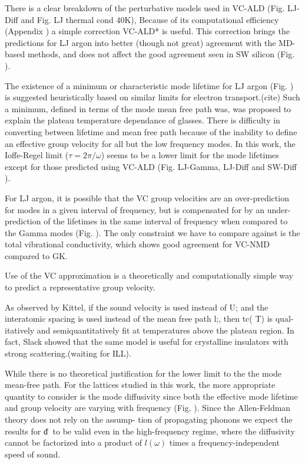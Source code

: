 \documentclass[aps,prb,onecolumn,preprint,superscriptaddress,amsmath,amssymb,floatfix]{revtex4}
\begin{document}
There is a clear breakdown of the perturbative models used in  
VC-ALD (Fig. LJ-Diff and Fig. LJ thermal cond 40K), 
Because of its computational efficiency (Appendix ) a simple correction 
VC-ALD* is useful. This correction brings the predictions for LJ argon 
into better (though not great) agreement with the MD-based methods, and 
does not affect the good agreement seen in SW silicon (Fig. ). 

The existence of a minimum or characteristic mode lifetime for 
LJ argon (Fig. ) is suggested heuristically based on similar limits 
for electron transport.(cite) Such a minimum, defined in terms of the mode 
mean free path was, was proposed to explain the plateau 
temperature dependance of glasses.\cite{graebner_phonon_1986} 
There is difficulty in converting 
between lifetime and mean free path because of the inability to 
define an effective group velocity for all but the low frequency modes. 
In this work, the Ioffe-Regel limit ($\tau = 2\pi/\omega $) seems to be 
a lower limit for the mode lifetimes except for those predicted 
using VC-ALD (Fig. LJ-Gamma, LJ-Diff and SW-Diff ). 

For LJ argon, it is possible that the VC group velocities are an over-prediction 
for modes in a given interval of frequency, 
but is compensated for 
by an under-prediction of the lifetimes in the same interval of 
frequency when compared to the Gamma modes (Fig. ). The only constraint 
we have to compare against is the total vibrational conductivity, which 
shows good agreement for VC-NMD compared to GK. 

Use of the VC approximation is a theoretically and 
computationally simple way to predict a representative group velocity.

As observed by Kittel, if the sound
velocity is used instead of U; and the interatomic spacing
is used instead of the mean free path l;, then tc( T) is qual-
itatively and semiquantitatively
fit at temperatures above
the plateau region.
In fact, Slack showed that the same model 
is useful for crystalline insulators with strong scattering.(waiting for 
ILL).\cite{henry_ehrenreich_thermal_1979}

While there is no theoretical justification for 
the lower limit to the the mode mean-free path.\cite{graebner_phonon_1986} 
For the lattices studied in this work, the more appropriate quantity to 
consider is the mode diffusivity since both the 
effective mode lifetime   
and group velocity are varying with frequency (Fig. ). 
Since the Allen-Feldman theory does not rely on the assump-
tion of propagating phonons we expect the results for d͑␻͒
to be valid even in the high-frequency regime, where the
diffusivity cannot be factorized into a product of $l(\omega)$ times
a frequency-independent speed of sound.
\end{document}
